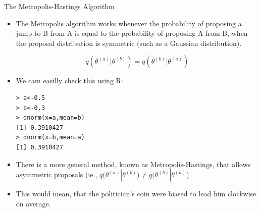 \documentclass[handout]{beamer}
\begin{document}
\begin{frame}[fragile]{The Metropolis-Hastings Algorithm}
\scriptsize{

\begin{itemize}

\item The Metropolis algorithm works whenever the probability of proposing a jump to B from A is equal to the probability of proposing A from B, when the proposal distribution is symmetric (such as a Gaussian distribution).

\begin{displaymath}
q(\theta^{(a)}|\theta^{(b)}) =  q(\theta^{(b)}|\theta^{(a)})
\end{displaymath}

\item We cam easilly check this using R:

\begin{verbatim}
> a<-0.5
> b<-0.3
> dnorm(x=a,mean=b)
[1] 0.3910427
> dnorm(x=b,mean=a)
[1] 0.3910427
\end{verbatim}



\item There is a more general method, known as Metropolis-Hastings, that allows asymmetric proposals (ie., $q(\theta^{(a)}|\theta^{(b)}) \neq  q(\theta^{(b)}|\theta^{(a)}$).

\item This would mean, that the politician's coin were biased to lead him clockwise on average.


\end{itemize}


} 
\end{frame}
\end{document}
